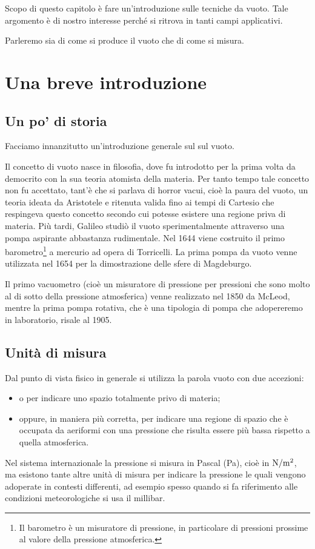 Scopo di questo capitolo è fare un'introduzione sulle tecniche da vuoto. Tale argomento è di nostro interesse perché si ritrova in tanti campi applicativi.

Parleremo sia di come si produce il vuoto che di come si misura.

\section{Una breve introduzione}

\subsection{Un po' di storia}
Facciamo innanzitutto un'introduzione generale sul sul vuoto.

Il concetto di vuoto nasce in filosofia, dove fu introdotto per la prima volta da democrito con la sua teoria atomista della materia. Per tanto tempo tale concetto non fu accettato, tant'è che si parlava di horror vacui, cioè la paura del vuoto, un teoria ideata da Aristotele e ritenuta valida fino ai tempi di Cartesio che respingeva questo concetto secondo cui potesse esistere una regione priva di materia. Più tardi, Galileo studiò il vuoto sperimentalmente attraverso una pompa aspirante abbastanza rudimentale. Nel 1644 viene costruito il primo barometro\footnote{Il barometro è un misuratore di pressione, in particolare di pressioni prossime al valore della pressione atmosferica.} a mercurio ad opera di Torricelli. La prima pompa da vuoto venne utilizzata nel 1654 per la dimostrazione delle sfere di Magdeburgo.

Il primo vacuometro (cioè un misuratore di pressione per pressioni che sono molto al di sotto della pressione atmosferica) venne realizzato nel 1850 da McLeod, mentre la prima pompa rotativa, che è una tipologia di pompa che adopereremo in laboratorio, risale al 1905.

\subsection{Unità di misura}
Dal punto di vista fisico in generale si utilizza la parola vuoto con due accezioni:
\begin{itemize}[leftmargin=0.5cm]
   \item o per indicare uno spazio totalmente privo di materia;
   \item oppure, in maniera più corretta, per indicare una regione di spazio che è occupata da aeriformi con una pressione che risulta essere più bassa rispetto a quella atmosferica.
\end{itemize}
Nel sistema internazionale la pressione si misura in Pascal (Pa), cioè in $\rm N/m^2$, ma esistono tante altre unità di misura per indicare la pressione le quali vengono adoperate in contesti differenti, ad esempio spesso quando si fa riferimento alle condizioni meteorologiche si usa il millibar.
